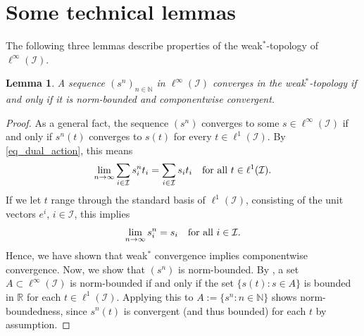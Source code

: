 \documentclass[10pt, oneside, a4paper]{article}
\newcommand{\N}{\mathbb{N}}
\newcommand{\R}{\mathbb{R}}
\newcommand{\IC}{\mathcal{I}}
\newtheorem{lemma}{Lemma}[section]
\begin{document}
\appendix

\section{Some technical lemmas}\label{sec_appendix}

The following three lemmas describe properties of the weak$^*$-topology of $\ell^{\infty}(\IC)$.%

\begin{lemma}\label{lem_weakstar1}
A sequence $(s^n)_{n\in\N}$ in $\ell^{\infty}(\IC)$ converges in the weak$^*$-topology if and only if it is norm-bounded and componentwise convergent.
\end{lemma}

\begin{proof}
As a general fact, the sequence $(s^n)$ converges to some $s \in \ell^{\infty}(\IC)$ if and only if $s^n(t)$ converges to $s(t)$ for every $t \in \ell^1(\IC)$. By \eqref{eq_dual_action}, this means%
\begin{equation*}
  \lim_{n \rightarrow \infty} \sum_{i \in \IC} s^n_it_i = \sum_{i \in \IC} s_it_i \mbox{\quad for all\ } t \in \ell^1(\IC).%
\end{equation*}
If we let $t$ range through the standard basis of $\ell^1(\IC)$, consisting of the unit vectors $e^i$, $i \in \IC$, this implies%
\begin{equation*}
  \lim_{n \rightarrow \infty} s^n_i = s_i\mbox{\quad for all\ } i \in \IC.%
\end{equation*}
Hence, we have shown that weak$^*$ convergence implies componentwise convergence. Now, we show that $(s^n)$ is norm-bounded. By \cite[Cor.~2.6.8]{Meg}, a set $A \subset \ell^{\infty}(\IC)$ is norm-bounded if and only if the set $\{ s(t) : s \in A \}$ is bounded in $\R$ for each $t \in \ell^1(\IC)$. Applying this to $A := \{ s^n : n \in \N \}$ shows norm-boundedness, since $s^n(t)$ is convergent (and thus bounded) for each $t$ by assumption.%


\end{proof}
\end{document}
